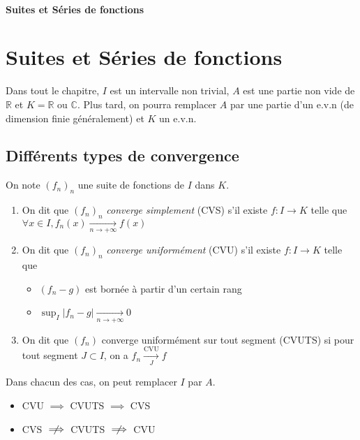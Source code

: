 \ifsolo
    ~

    \vspace{1cm}

    \begin{center}
        \textbf{\LARGE Suites et Séries de fonctions} \\[1em]
    \end{center}
    \tableofcontents
\else
    \chapter{Suites et Séries de fonctions}

    \minitoc
\fi
\thispagestyle{empty}

Dans tout le chapitre, $I$ est un intervalle non trivial, $A$ est une partie non vide de $\mathbb R$ et $K=\mathbb R$ ou $\mathbb C$. Plus tard, on pourra remplacer $A$ par une partie d'un e.v.n (de dimension finie généralement) et $K$ un e.v.n.

\section{Différents types de convergence}

\begin{dfn}
    On note $(f_n)_n$ une suite de fonctions de $I$ dans $K$. \begin{enumerate}
        \item On dit que $(f_n)_n$ \emph{converge simplement} (CVS) s'il existe $f:I\to K$ telle que $\forall x\in I, f_n(x)\xrightarrow[n\to+\infty]{} f(x)$
        \item On dit que $(f_n)_n$ \emph{converge uniformément} (CVU) s'il existe $f:I\to K$ telle que \begin{itemize}
            \item $(f_n-g)$ est bornée à partir d'un certain rang
            \item $\sup_I|f_n-g|\xrightarrow[n\to+\infty]{}0$
        \end{itemize}
    \item On dit que $(f_n)$ converge uniformément sur tout segment (CVUTS) si pour tout segment $J\subset I$, on a $f_n\xrightarrow[J]{\mathrm{CVU}}f$
    \end{enumerate}
    Dans chacun des cas, on peut remplacer $I$ par $A$.
\end{dfn}

\begin{rem}
    \begin{itemize}
        \item CVU $\implies$ CVUTS $\implies$ CVS
        \item CVS $\centernot\implies$ CVUTS $\centernot \implies$ CVU
    \end{itemize}
\end{rem}

